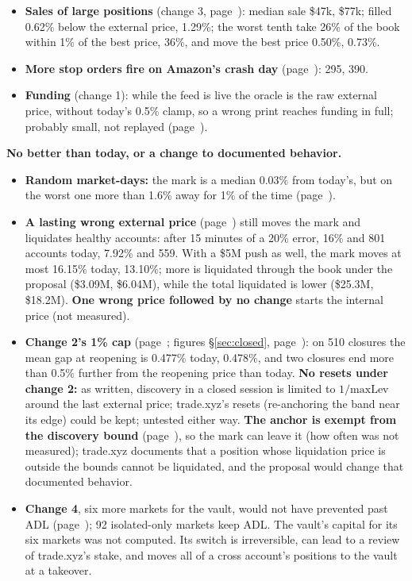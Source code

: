 {\begin{itemize}[leftmargin=1.3em,itemsep=0pt,topsep=0pt,parsep=0pt]
\item \textbf{Sales of large positions} (change 3, page~\pageref{sec:res-cut}): median sale \$47k, \$77k; filled 0.62\% below the external price, 1.29\%; the worst tenth take 26\% of the book within 1\% of the best price, 36\%, and move the best price 0.50\%, 0.73\%.
\item \textbf{More stop orders fire on Amazon's crash day} (page~\pageref{sec:users}): 295, 390.
\item \textbf{Funding} (change 1): while the feed is live the oracle is the raw external price, without today's 0.5\% clamp, so a wrong print reaches funding in full; probably small, not replayed (page~\pageref{sec:limits}).
\end{itemize}
\textbf{No better than today, or a change to documented behavior.}
\begin{itemize}[leftmargin=1.3em,itemsep=0pt,topsep=0pt,parsep=0pt]
\item \textbf{Random market-days:} the mark is a median 0.03\% from today's, but on the worst one more than 1.6\% away for 1\% of the time (page~\pageref{sec:users}).
\item \textbf{A lasting wrong external price} (page~\pageref{sec:attacks}) still moves the mark and liquidates healthy accounts: after 15 minutes of a 20\% error, 16\% and 801 accounts today, 7.92\% and 559. With a \$5M push as well, the mark moves at most 16.15\% today, 13.10\%; more is liquidated through the book under the proposal (\$3.09M, \$6.04M), while the total liquidated is lower (\$25.3M, \$18.2M). \textbf{One wrong price followed by no change} starts the internal price (not measured).
\item \textbf{Change 2's 1\% cap} (page~\pageref{sec:notlive}; figures \S\ref{sec:closed}, page~\pageref{sec:closed}): on 510 closures the mean gap at reopening is 0.477\% today, 0.478\%, and two closures end more than 0.5\% further from the reopening price than today. \textbf{No resets under change 2:} as written, discovery in a closed session is limited to $1/\text{maxLev}$ around the last external price; trade.xyz's resets (re-anchoring the band near its edge) could be kept; untested either way. \textbf{The anchor is exempt from the discovery bound} (page~\pageref{sec:vote}), so the mark can leave it (how often was not measured); trade.xyz documents that a position whose liquidation price is outside the bounds cannot be liquidated, and the proposal would change that documented behavior.
\item \textbf{Change 4}, six more markets for the vault, would not have prevented past ADL (page~\pageref{sec:ceiling}); 92 isolated-only markets keep ADL. The vault's capital for its six markets was not computed. Its switch is irreversible, can lead to a review of trade.xyz's stake, and moves all of a cross account's positions to the vault at a takeover.

\end{itemize}}

